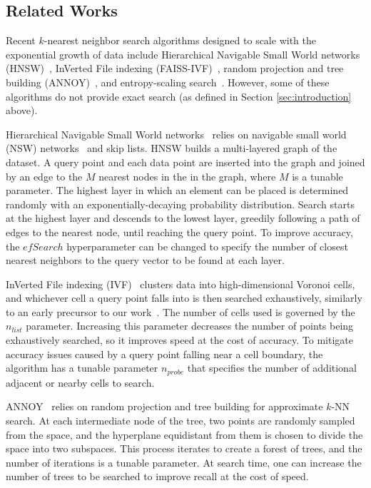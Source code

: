 \subsection{Related Works}
\label{sec:intoduction:related-works}

Recent $k$-nearest neighbor search algorithms designed to scale with the exponential growth of data include Hierarchical Navigable Small World networks (HNSW)~\cite{malkov2016hnsw}, InVerted File indexing (FAISS-IVF)~\cite{faissivf}, random projection and tree building (ANNOY)~\cite{annoy}, and entropy-scaling search~\cite{yu2015entropy, ishaq2019clustered}. However, some of these algorithms do not provide exact search (as defined in Section \ref{sec:introduction} above).

Hierarchical Navigable Small World networks~\cite{malkov2016hnsw} relies on navigable small world (NSW) networks~\cite{kleinberg2000navigation, boguna2009navigability} and skip lists.
HNSW builds a multi-layered graph of the dataset.
A query point and each data point are inserted into the graph and joined by an edge to the $M$ nearest nodes in the in the graph, where $M$ is a tunable parameter.
The highest layer in which an element can be placed is determined randomly with an exponentially-decaying probability distribution.
Search starts at the highest layer and descends to the lowest layer, greedily following a path of edges to the nearest node, until reaching the query point.
To improve accuracy, the $efSearch$ hyperparameter can be changed to specify the number of closest nearest neighbors to the query vector to be found at each layer.

InVerted File indexing (IVF)~\cite{faissivf, sacks1987multikey, kent1990signature} clusters data into high-dimensional Voronoi cells, and whichever cell a query point falls into is then searched exhaustively, similarly to an early precursor to our work~\cite{yu2015entropy}.
The number of cells used is governed by the $n_{list}$ parameter.
Increasing this parameter decreases the number of points being exhaustively searched, so it improves speed at the cost of accuracy.
To mitigate accuracy issues caused by a query point falling near a cell boundary, the algorithm has a tunable parameter $n_{probe}$ that specifies the number of additional adjacent or nearby cells to search.

ANNOY~\cite{annoy} relies on random projection and tree building for approximate $k$-NN search.
At each intermediate node of the tree, two points are randomly sampled from the space, and the hyperplane equidistant from them is chosen to divide the space into two subspaces.
This process iterates to create a forest of trees, and the number of iterations is a tunable parameter.
At search time, one can increase the number of trees to be searched to improve recall at the cost of speed.



